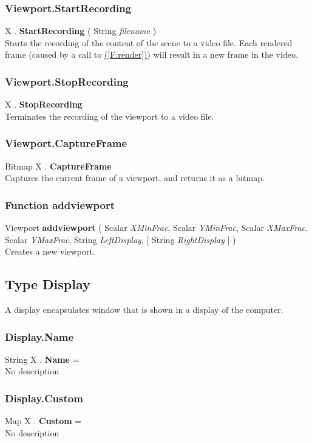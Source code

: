 \documentclass[10pt]{book}
\newcommand{\linkitem}[1]{\hyperref[#1]{\nameref{#1} (\ref{#1})}}
\begin{document}
\subsubsection{Viewport.StartRecording \label{F:Viewport:StartRecording}}
X . \textbf{StartRecording} ( String \textit{filename} ) \\
Starts the recording of the content of the scene to a video file. Each rendered frame (caused by a call to \linkitem{F:render}) will result in a new frame in the video.

\subsubsection{Viewport.StopRecording \label{F:Viewport:StopRecording}}
X . \textbf{StopRecording} \\
Terminates the recording of the viewport to a video file.

\subsubsection{Viewport.CaptureFrame \label{F:Viewport:CaptureFrame}}
Bitmap X . \textbf{CaptureFrame} \\
Captures the current frame of a viewport, and returns it as a bitmap.

\subsubsection{Function addviewport \label{F:addviewport}}
Viewport \textbf{addviewport} ( Scalar \textit{XMinFrac}, Scalar \textit{YMinFrac}, Scalar \textit{XMaxFrac}, Scalar \textit{YMaxFrac}, String \textit{LeftDisplay},  [ String \textit{RightDisplay} ] ) \\
Creates a new viewport.

\subsection{Type Display \label{T:Display}}
A display encapsulates window that is shown in a display of the computer.

\subsubsection{Display.Name \label{F:Display:Name}}
String X . \textbf{Name} = \\
No description

\subsubsection{Display.Custom \label{F:Display:Custom}}
Map X . \textbf{Custom} = \\
No description
\end{document}
